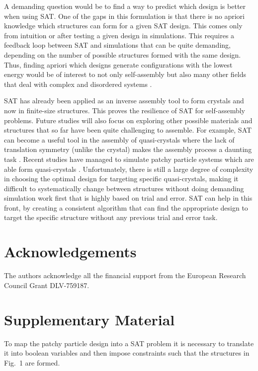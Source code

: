 \documentclass[a4paper, amsfonts, amssymb, amsmath, reprint, showkeys, nofootinbib, twoside]{revtex4-1}
\begin{document}
A demanding question would be to find a way to predict which design is better when using SAT. One of the gaps in this formulation is that there is no apriori knowledge which structures can form for a given SAT design. This comes only from intuition or after testing a given design in simulations. This requires a feedback loop between SAT and simulations that can be quite demanding, depending on the number of possible structures formed with the same design. Thus, finding apriori which designs generate configurations with the lowest energy would be of interest to not only self-assembly but also many other fields that deal with complex and disordered systems \cite{Franz2017}.

SAT has already been applied as an inverse assembly tool to form crystals and now in finite-size structures. This proves the resilience of SAT for self-assembly problems. Future studies will also focus on exploring other possible materials and structures that so far have been quite challenging to assemble. For example, SAT can become a useful tool in the assembly of quasi-crystals where the lack of translation symmetry (unlike the crystal) makes the assembly process a daunting task \cite{Shechtman1984}. Recent studies have managed to simulate patchy particle systems which are able form quasi-crystals \cite{Noya2021}. Unfortunately, there is still a large degree of complexity in choosing the optimal design for targeting specific quasi-crystals, making it difficult to systematically change between structures without doing demanding simulation work first that is highly based on trial and error. SAT can help in this front, by creating a consistent algorithm that can find the appropriate design to target the specific structure without any previous trial and error task.

\section{Acknowledgements}

The authors acknowledge all the financial support from the European Research Council Grant DLV-759187.



\section{Supplementary Material}

To map the patchy particle design into a SAT problem it is necessary to translate it into boolean variables and then impose constraints such that the structures in Fig.~1 are formed.
\end{document}
